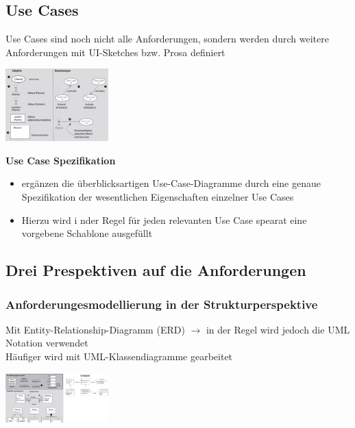 \documentclass{report}
\newenvironment{Figure}
	{\par\medskip\noindent\minipage{\linewidth}}
	{\endminipage\par\medskip}
\theoremstyle{definition}
\theoremstyle{example}
\begin{document}
\subsection{Use Cases}
Use Cases sind noch nicht alle Anforderungen, sondern werden durch weitere Anforderungen mit UI-Sketches bzw. Prosa definiert
\begin{Figure}
   \centering
    \includegraphics[width=150px]{img/UseCaseElemente.png}
        \label{fig:Modellelemente Use Case}
\end{Figure}

\textbf{Use Case Spezifikation}
\begin{itemize}
   \item ergänzen die überblicksartigen Use-Case-Diagramme durch eine genaue Spezifikation der wesentlichen Eigenschaften einzelner Use Cases
   \item Hierzu wird i nder Regel für jeden relevanten Use Case spearat eine vorgebene Schablone ausgefüllt
\end{itemize}

\subsection{Drei Prespektiven auf die Anforderungen}

\subsubsection{Anforderungesmodellierung in der Strukturperspektive}
Mit Entity-Relationship-Diagramm (ERD) $\rightarrow$ in der Regel wird jedoch die UML Notation verwendet\\

Häufiger wird mit UML-Klassendiagramme gearbeitet
\begin{Figure}
   \centering
    \includegraphics[width=150px]{img/UMLKlassendiagramm.png}
        \label{fig:Elemente des UML Klassendiagramm}
\end{Figure}
\end{document}
